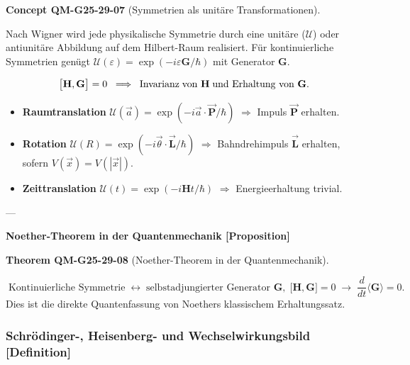\documentclass[10pt, letterpaper]{article}
\newcommand{\CustomHeading}[3]{%
  \par\medskip\noindent%
  \textbf{#1 #2} \textnormal{(#3)}.\enskip%
}
\newenvironment{THEO}[2]{\begin{unitbox}\CustomHeading{Theorem}{#1}{#2}}{\end{unitbox}}
\newenvironment{CONC}[2]{\begin{unitbox}\CustomHeading{Concept}{#1}{#2}}{\end{unitbox}}
\begin{document}
\begin{CONC}{QM-G25-29-07}{Symmetrien als unitäre Transformationen}
Nach Wigner wird jede physikalische Symmetrie durch eine unitäre
($\mathcal U$) oder antiunitäre Abbildung auf dem Hilbert-Raum realisiert.  
Für kontinuierliche Symmetrien genügt $\mathcal U(\varepsilon)=
\exp(-i\varepsilon\mathbf G/\hbar)$ mit Generator $\mathbf G$.

\[
\bigl[\mathbf H,\mathbf G\bigr]=0
\;\;\Longrightarrow\;\;
\text{Invarianz\;von }\mathbf H\;\text{und Erhaltung von }\mathbf G.
\]

\begin{itemize}
\item \textbf{Raumtranslation}  
      $\mathcal U(\vec a)=\exp(-i\vec a\!\cdot\!\vec{\mathbf P}/\hbar)$  
      $\Rightarrow$ Impuls $\vec{\mathbf P}$ erhalten.
\item \textbf{Rotation}  
      $\mathcal U(R)=\exp(-i\vec\theta\!\cdot\!\vec{\mathbf L}/\hbar)$  
      $\Rightarrow$ Bahndrehimpuls $\vec{\mathbf L}$ erhalten, sofern
      $V(\vec x)=V(|\vec x|)$.
\item \textbf{Zeittranslation}  
      $\mathcal U(t)=\exp(-i\mathbf H t/\hbar)$  
      $\Rightarrow$ Energieerhaltung trivial.
\end{itemize}
\end{CONC}

---

\textbf{Noether-Theorem in der Quantenmechanik [Proposition]}

\begin{THEO}{QM-G25-29-08}{Noether-Theorem in der Quantenmechanik}
\[
\boxed{\;
\text{Kontinuierliche Symmetrie}\;
\longleftrightarrow\;
\text{selbstadjungierter Generator }\mathbf G,\;
\bigl[\mathbf H,\mathbf G\bigr]=0\;
\longrightarrow\;
\frac{d}{dt}\langle\mathbf G\rangle=0.
}
\]
Dies ist die direkte Quantenfassung von Noethers klassischem
Erhaltungssatz.
\end{THEO}


\subsubsection*{Schrödinger-, Heisenberg- und Wechselwirkungsbild [Definition]}
\end{document}
